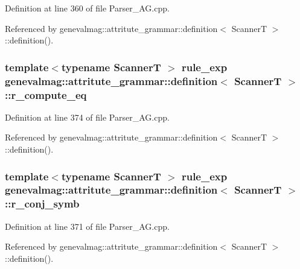 Definition at line 360 of file Parser\_\-AG.cpp.



Referenced by genevalmag::attritute\_\-grammar::definition$<$ ScannerT $>$::definition().

\hypertarget{structgenevalmag_1_1attritute__grammar_1_1definition_ab9840756f2fe52673ec64e2825e9581b}{
\subsubsection[{r\_\-compute\_\-eq}]{\setlength{\rightskip}{0pt plus 5cm}template$<$typename ScannerT $>$ {\bf rule\_\-exp} {\bf genevalmag::attritute\_\-grammar::definition}$<$ ScannerT $>$::{\bf r\_\-compute\_\-eq}}}
\label{structgenevalmag_1_1attritute__grammar_1_1definition_ab9840756f2fe52673ec64e2825e9581b}


Definition at line 374 of file Parser\_\-AG.cpp.



Referenced by genevalmag::attritute\_\-grammar::definition$<$ ScannerT $>$::definition().

\hypertarget{structgenevalmag_1_1attritute__grammar_1_1definition_a72f5a181b2ba65c16488f2c2e2777ea4}{
\subsubsection[{r\_\-conj\_\-symb}]{\setlength{\rightskip}{0pt plus 5cm}template$<$typename ScannerT $>$ {\bf rule\_\-exp} {\bf genevalmag::attritute\_\-grammar::definition}$<$ ScannerT $>$::{\bf r\_\-conj\_\-symb}}}
\label{structgenevalmag_1_1attritute__grammar_1_1definition_a72f5a181b2ba65c16488f2c2e2777ea4}


Definition at line 371 of file Parser\_\-AG.cpp.



Referenced by genevalmag::attritute\_\-grammar::definition$<$ ScannerT $>$::definition().

